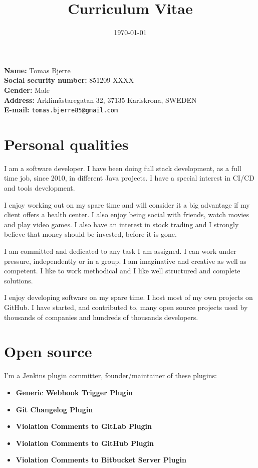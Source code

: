 \documentclass[a4paper]{article}
\title{\textbf{Curriculum Vitae}}
\date{\today}
\begin{document}
\maketitle
\thispagestyle{empty}

\textbf{Name:} Tomas Bjerre \\
\textbf{Social security number:} 851209-XXXX \\
\textbf{Gender:} Male \\
\textbf{Address:} Arklim\"astaregatan 32, 37135 Karlskrona, SWEDEN \\
\textbf{E-mail:} \texttt{tomas.bjerre85@gmail.com} \\

\section*{Personal qualities}
I am a software developer. I have been doing full stack development, as a full time job, since 2010, in different Java projects. I have a special interest in CI/CD and tools development.

I enjoy working out on my spare time and will consider it a big advantage if my client offers a health center. I also enjoy being social with friends, watch movies and play video games. I also have an interest in stock trading and I strongly believe that money should be invested, before it is gone.

I am committed and dedicated to any task I am assigned. I can work under pressure, independently or in a group. I am imaginative and creative as well as competent. I like to work methodical and I like well structured and complete solutions.

I enjoy developing software on my spare time. I host most of my own projects on GitHub. I have started, and contributed to, many open source projects used by thousands of companies and hundreds of thousands developers.

\newpage

\section*{Open source}
I'm a Jenkins plugin committer, founder/maintainer of these plugins:

\begin{itemize}
 \item \textbf{Generic Webhook Trigger Plugin}
 \item \textbf{Git Changelog Plugin}
 \item \textbf{Violation Comments to GitLab Plugin}
 \item \textbf{Violation Comments to GitHub Plugin}
 \item \textbf{Violation Comments to Bitbucket Server Plugin}
\end{itemize}
\end{document}

